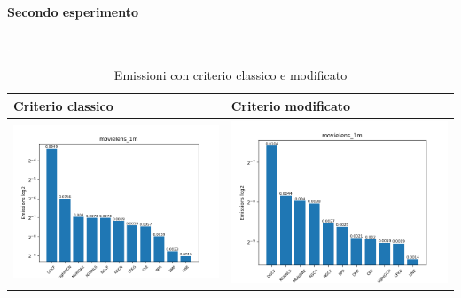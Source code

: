 \paragraph{Secondo esperimento} \textcolor{white}{.} \\
\begin{table}[H]
    \centering
    \footnotesize
    \setlength\tabcolsep{0pt}
    \begin{tabularx}{\textwidth}{|X|X|}
        \hline
        \textbf{Criterio classico} & \textbf{Criterio modificato} \\
        \hline
        \includegraphics[width=\linewidth, trim=0 0 0 0]{images/emissions_movielens_1m_30_5_earlyClassic.png} &
        \includegraphics[width=\linewidth, trim=0 0 0 0]{images/emissions_movielens_1m_30_5_earlyModified.png} \\
        \hline
    \end{tabularx}
    \caption{Emissioni con criterio classico e modificato}
    \label{tab:emissions_info}
\end{table}




